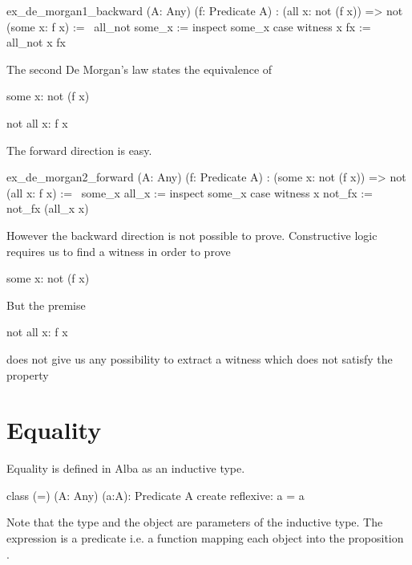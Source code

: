 \begin{alba}
    ex_de_morgan1_backward
        (A: Any)
        (f: Predicate A)
        : (all x: not (f x)) => not (some x: f x)
    :=
        \   all_not
            some_x
        :=
            inspect some_x case
                witness x fx :=
                    all_not x fx
\end{alba}

The second De Morgan's law states the equivalence of
\begin{alba}
  some x: not (f x)

  not all x: f x
\end{alba}

The forward direction is easy.

\begin{alba}
    ex_de_morgan2_forward
        (A: Any)
        (f: Predicate A)
        : (some x: not (f x)) => not (all x: f x)
    :=
        \   some_x
            all_x
        :=
            inspect some_x case
                witness x not_fx :=
                    not_fx (all_x x)
\end{alba}

However the backward direction is not possible to prove. Constructive logic
requires us to find a witness in order to prove
\begin{alba}
  some x: not (f x)
\end{alba}
%
But the premise
%
\begin{alba}
  not all x: f x
\end{alba}
does not give us any possibility to extract a witness which does not satisfy
the property 










\section{Equality}

Equality is defined in Alba as an inductive type.
\begin{alba}
    class
        (=) (A: Any) (a:A): Predicate A
    create
        reflexive: a = a
\end{alba}

Note that the type  and the object  are parameters of the
inductive type. The expression  is a predicate i.e. a function
 mapping each object  into the
proposition .

